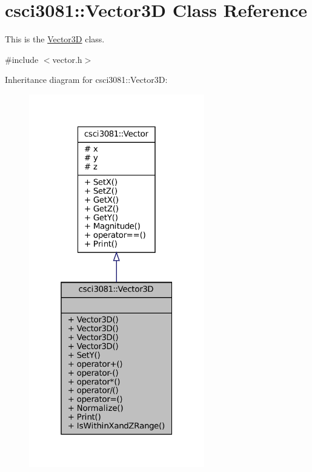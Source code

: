 \hypertarget{classcsci3081_1_1Vector3D}{}\section{csci3081\+:\+:Vector3D Class Reference}
\label{classcsci3081_1_1Vector3D}


This is the \hyperlink{classcsci3081_1_1Vector3D}{Vector3D} class.  




{\ttfamily \#include $<$vector.\+h$>$}



Inheritance diagram for csci3081\+:\+:Vector3D\+:
\nopagebreak
\begin{figure}[H]
\begin{center}
\leavevmode
\includegraphics[width=217pt]{classcsci3081_1_1Vector3D__inherit__graph}
\end{center}
\end{figure}
